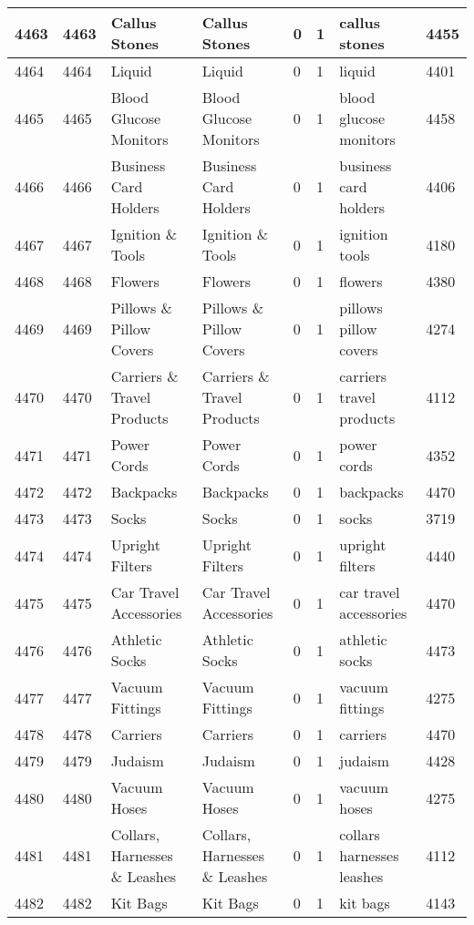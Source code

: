 \begin{longtable}{|l|l|l|l|l|l|l|l|}
4463 & 4463 & Callus Stones & Callus Stones & 0 & 1 & callus stones & 4455 \\ \hline 
4464 & 4464 & Liquid & Liquid & 0 & 1 & liquid & 4401 \\ \hline 
4465 & 4465 & Blood Glucose Monitors & Blood Glucose Monitors & 0 & 1 & blood glucose monitors & 4458 \\ \hline 
4466 & 4466 & Business Card Holders & Business Card Holders & 0 & 1 & business card holders & 4406 \\ \hline 
4467 & 4467 & Ignition \& Tools & Ignition \& Tools & 0 & 1 & ignition tools & 4180 \\ \hline 
4468 & 4468 & Flowers & Flowers & 0 & 1 & flowers & 4380 \\ \hline 
4469 & 4469 & Pillows \& Pillow Covers & Pillows \& Pillow Covers & 0 & 1 & pillows pillow covers & 4274 \\ \hline 
4470 & 4470 & Carriers \& Travel Products & Carriers \& Travel Products & 0 & 1 & carriers travel products & 4112 \\ \hline 
4471 & 4471 & Power Cords & Power Cords & 0 & 1 & power cords & 4352 \\ \hline 
4472 & 4472 & Backpacks & Backpacks & 0 & 1 & backpacks & 4470 \\ \hline 
4473 & 4473 & Socks & Socks & 0 & 1 & socks & 3719 \\ \hline 
4474 & 4474 & Upright Filters & Upright Filters & 0 & 1 & upright filters & 4440 \\ \hline 
4475 & 4475 & Car Travel Accessories & Car Travel Accessories & 0 & 1 & car travel accessories & 4470 \\ \hline 
4476 & 4476 & Athletic Socks & Athletic Socks & 0 & 1 & athletic socks & 4473 \\ \hline 
4477 & 4477 & Vacuum Fittings & Vacuum Fittings & 0 & 1 & vacuum fittings & 4275 \\ \hline 
4478 & 4478 & Carriers & Carriers & 0 & 1 & carriers & 4470 \\ \hline 
4479 & 4479 & Judaism & Judaism & 0 & 1 & judaism & 4428 \\ \hline 
4480 & 4480 & Vacuum Hoses & Vacuum Hoses & 0 & 1 & vacuum hoses & 4275 \\ \hline 
4481 & 4481 & Collars, Harnesses \& Leashes & Collars, Harnesses \& Leashes & 0 & 1 & collars harnesses leashes & 4112 \\ \hline 
4482 & 4482 & Kit Bags & Kit Bags & 0 & 1 & kit bags & 4143 \\ \hline 

\end{longtable}
